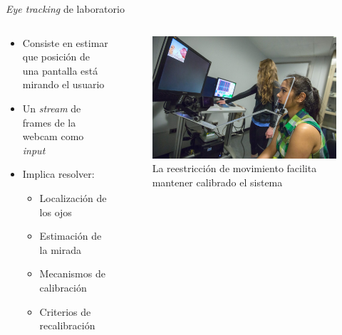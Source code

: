 \documentclass[aspectratio=169]{beamer}
\begin{document}
\begin{frame}{\textit{Eye tracking} de laboratorio}

  \begin{columns}
    \begin{column}{0.5\textwidth}
      \begin{itemize}
        \item Consiste en estimar que posición de una pantalla está mirando el
          usuario
        \item Un \textit{stream} de frames de la webcam como \textit{input}
        \item Implica resolver: \begin{itemize}
            \item Localización de los ojos
            \item Estimación de la mirada
            \item Mecanismos de calibración
            \item Criterios de recalibración
        \end{itemize}
      \end{itemize}
    \end{column}

    \begin{column}{0.5\textwidth}
      \begin{figure}
        \centering
        \includegraphics[width=\linewidth]{img/eye-link-chinrest.jpg}
        \caption{La reestricción de movimiento facilita mantener calibrado el
        sistema}
      \end{figure}
    \end{column}
  \end{columns}
\end{frame}
\end{document}
